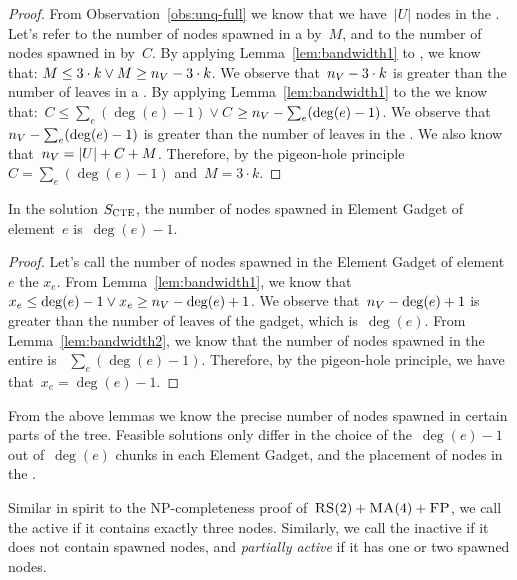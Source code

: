 \begin{proof}
  From Observation~\ref{obs:unq-full} we know that we have~$|U|$ nodes
  in the {\UnqSubtree}. Let's refer to the number of nodes spawned in
  a {\MatchSubtree} by~$M$, and to the number of nodes spawned in
  {\CoverSubtree} by~$C$. By applying Lemma~\ref{lem:bandwidth1} to
  {\MatchSubtree}, we know that: $ M \leq 3\cdot k \vee M \geq n_V - 3\cdot k$.
  We observe that~$n_V - 3\cdot k$ is greater than the number of
  leaves in a {\MatchSubtree}.  By applying Lemma~\ref{lem:bandwidth1}
  to the {\CoverSubtree} we know that:~$ C \leq \sum_e(\deg(e)-1) \vee C$ $\geq n_V - \sum_e(\deg(e)-1)$.
  We observe that~$n_V - \sum_e(\deg(e)-1)$ is greater than the number
  of leaves in the {\CoverSubtree}.
  We also know that~$n_V = |U| + C + M$. Therefore, by the pigeon-hole principle
 ~$C = \sum_e(\deg(e)-1)$ and~$M = 3\cdot k$.
\end{proof}


\begin{lemma}
  In the solution $S_{\mathrm{\textsc{CTE}}}$, the number of nodes spawned in Element Gadget of
  element~$e$ is~$\deg(e)-1$.
  \label{lem:bandwidth3}
\end{lemma}

\begin{proof}
  Let's call the number of nodes spawned in the Element Gadget of
  element~$e$ the $x_e$.  From Lemma~\ref{lem:bandwidth1}, we know that
 ~$x_e \leq \deg(e) - 1 \vee x_e \geq n_V - \deg(e) + 1$. We observe
  that~$n_V - \deg(e) + 1$ is greater than the number of leaves of the
  gadget, which is~$\deg(e)$.  From Lemma~\ref{lem:bandwidth2}, we know
  that the number of nodes spawned in the entire {\CoverSubtree} is
 ~$\sum_e (\deg(e)-1)$. Therefore, by the pigeon-hole principle, we have
  that~$x_e = \deg(e)-1$.
\end{proof}

From the above lemmas we know the precise number of nodes spawned in
certain parts of the tree. Feasible solutions only differ in 
the choice of the~$\deg(e) - 1$ out of~$\deg(e)$ chunks
in each Element Gadget, and the placement of nodes in the
{\MatchSubtree}.



Similar in spirit to the NP-completeness proof of~$\textsc{RS}(2)+\textsc{MA}(4)+\textsc{FP}$,
we call the {\TripleGadget} active if it contains exactly three nodes. 
Similarly, we call the {\TripleGadget} inactive if it
does not contain spawned nodes, and \emph{partially active} if it
has one or two
spawned nodes.

